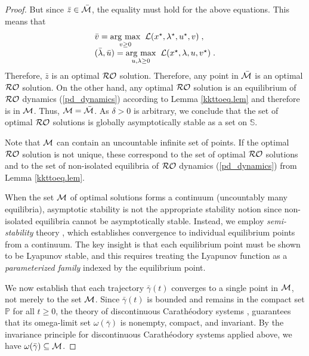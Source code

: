\documentclass[journal,twoside,web]{ieeecolor}
\newcommand{\rev}[1]{#1}
\newcommand{\argmax}[1]{\underset{#1}{\operatorname{arg}\,\operatorname{max}}\;}
\begin{document}
\begin{proof}
But since $\bar{z}\in \bar {\cal M}$, the equality must hold for the above equations. This means that
\begin{align*}
\begin{array}{l}
\bar{v}=\argmax{v \geq 0}\; {\cal L}(x^\star,\lambda^\star,u^\star,v)\;,\\
(\bar{\lambda},\bar{u})=\argmax{u,\lambda \geq 0}\; {\cal L}(x^\star,\lambda,u,v^\star)\;.
\end{array}
\end{align*}
Therefore, ${\bar{z}}$ is an optimal ${\cal RO}$ solution. Therefore, any point in $\bar{{\cal M}}$ is an optimal ${\cal RO}$ solution. On the other hand, any optimal ${\cal RO}$ solution is an equilibrium of ${\cal RO}$ dynamics (\ref{pd_dynamics}) according to Lemma \ref{kkttoeq.lem} and therefore is in ${\cal M}$. Thus, ${\cal M}=\bar{\cal M}$. As $\delta>0$ is arbitrary, we conclude that the set of optimal ${\cal RO}$ solutions is globally asymptotically stable as a set on $\mathbb S$.

Note that ${\cal M}$ can contain an uncountable infinite set of points. If the optimal ${\cal RO}$ solution is not unique, these correspond to the set of optimal ${\cal RO}$ solutions and to the set of non-isolated equilibria of ${\cal RO}$ dynamics (\ref{pd_dynamics}) from Lemma \ref{kkttoeq.lem}.

\rev{When the set ${\cal M}$ of optimal solutions forms a continuum (uncountably many equilibria), asymptotic stability is not the appropriate stability notion since non-isolated equilibria cannot be asymptotically stable. Instead, we employ \textit{semi-stability} theory \cite{haddad2009semistability}, which establishes convergence to individual equilibrium points from a continuum. The key insight is that each equilibrium point must be shown to be Lyapunov stable, and this requires treating the Lyapunov function as a \textit{parameterized family} indexed by the equilibrium point.}

\rev{We now establish that each trajectory $\bar{\gamma}(t)$ converges to a single point in ${\cal M}$, not merely to the set ${\cal M}$. Since $\bar{\gamma}(t)$ is bounded and remains in the compact set $\mathbb P$ for all $t \geq 0$, the theory of discontinuous Carath\'{e}odory systems \cite[Proposition~3]{bacciotti2006nonpathological}, \cite[Lemma~4.4]{cherukuri2016} guarantees that its omega-limit set $\omega(\bar{\gamma})$ is nonempty, compact, and invariant. By the invariance principle for discontinuous Carathéodory systems applied above, we have $\omega(\bar{\gamma}) \subseteq {\cal M}$.}


\end{proof}
\end{document}
